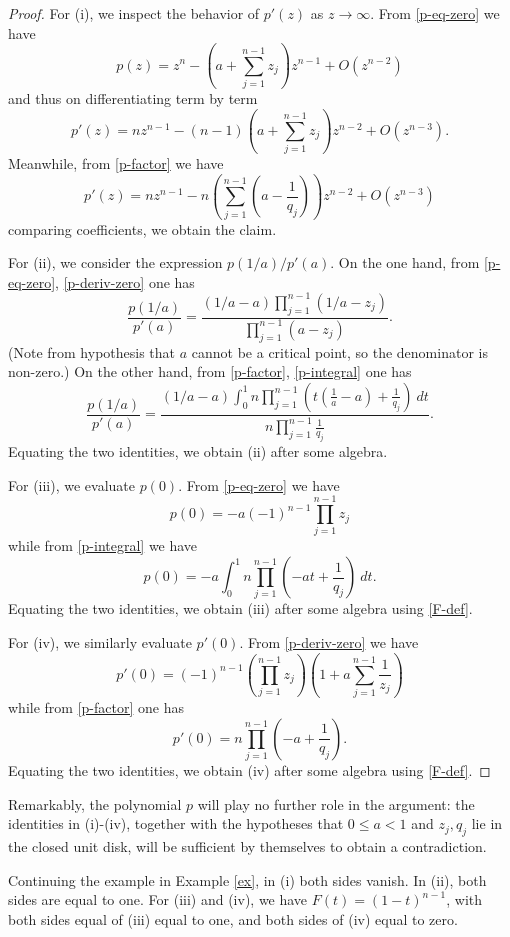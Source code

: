 \documentclass[12pt]{article}
\begin{document}
\begin{proof}  For (i), we inspect the behavior of $p'(z)$ as $z \to \infty$.  From \eqref{p-eq-zero} we have
    $$ p(z) = z^n - ( a + \sum_{j=1}^{n-1} z_j )  z^{n-1} + O(z^{n-2})$$
    and thus on differentiating term by term
    $$ p'(z) = n z^{n-1} - (n-1) ( a + \sum_{j=1}^{n-1} z_j ) z^{n-2} + O(z^{n-3}).$$
    Meanwhile, from \eqref{p-factor} we have
    $$ p'(z) = n z^{n-1} - n (\sum_{j=1}^{n-1} (a - \frac{1}{q_j})) z^{n-2} + O(z^{n-3})$$
comparing coefficients, we obtain the claim.

For (ii), we consider the expression $p(1/a) / p'(a)$.  On the one hand, from \eqref{p-eq-zero}, \eqref{p-deriv-zero} one has
$$ \frac{p(1/a)}{p'(a)} = \frac{(1/a - a) \prod_{j=1}^{n-1} (1/a - z_j)}{\prod_{j=1}^{n-1} (a-z_j)}.$$
(Note from hypothesis that $a$ cannot be a critical point, so the denominator is non-zero.)
On the other hand, from \eqref{p-factor}, \eqref{p-integral} one has
$$ \frac{p(1/a)}{p'(a)} = \frac{(1/a - a) \int_0^1 n \prod_{j=1}^{n-1} (t(\frac{1}{a} - a) + \frac{1}{q_j})\ dt}{n \prod_{j=1}^{n-1} \frac{1}{q_j}}.$$
Equating the two identities, we obtain (ii) after some algebra.

For (iii), we evaluate $p(0)$.  From \eqref{p-eq-zero} we have
$$     p(0) = -a (-1)^{n-1} \prod_{j=1}^{n-1} z_j$$
while from \eqref{p-integral} we have
$$ p(0) = -a \int_0^1 n \prod_{j=1}^{n-1} (-at + \frac{1}{q_j})\ dt.$$
Equating the two identities, we obtain (iii) after some algebra using \eqref{F-def}.

For (iv), we similarly evaluate $p'(0)$.  From \eqref{p-deriv-zero} we have
$$ p'(0) = (-1)^{n-1} (\prod_{j=1}^{n-1} z_j) (1 + a \sum_{j=1}^{n-1} \frac{1}{z_j})$$
while from \eqref{p-factor} one has
$$ p'(0) = n \prod_{j=1}^{n-1} (- a + \frac{1}{q_j}).$$
Equating the two identities, we obtain (iv) after some algebra using \eqref{F-def}.
\end{proof}

Remarkably, the polynomial $p$ will play no further role in the argument: the identities in (i)-(iv), together with the hypotheses that $0 \leq a < 1$ and $z_j, q_j$ lie in the closed unit disk, will be sufficient by themselves to obtain a contradiction.

\begin{example}  Continuing the example in Example \ref{ex}, in (i) both sides vanish.  In (ii), both sides are equal to one.  For (iii) and (iv), we have $F(t) = (1-t)^{n-1}$, with both sides equal of (iii) equal to one, and both sides of (iv) equal to zero.
\end{example}
\end{document}
